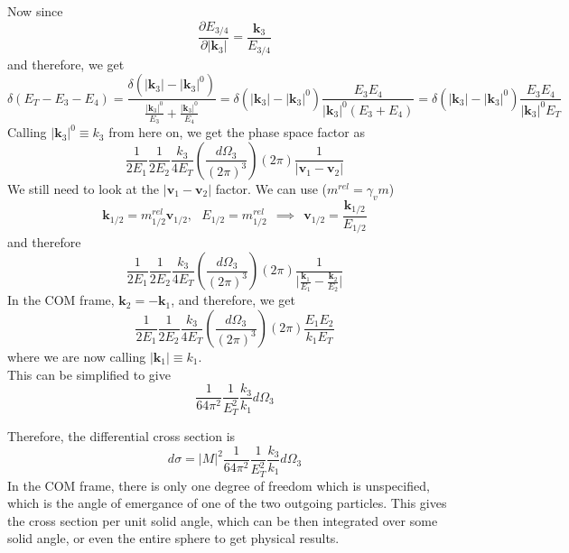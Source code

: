 \documentclass[11pt, notitlepage]{report}
\newcommand{\del}{\partial}
\numberwithin{equation}{section}
\begin{document}
Now since
\begin{equation*}
    \frac{\del E_{3/4}}{\del |\textbf{k}_3|} = \frac{\textbf{k}_3}{E_{3/4}}
\end{equation*}
and therefore, we get 
\begin{equation*}
    \delta(E_T - E_3 - E_4) = \frac{\delta\left(|\textbf{k}_3| - |\textbf{k}_3|^0\right)}{\displaystyle \frac{|\textbf{k}_3|^0}{E_3} + \frac{|\textbf{k}_3|^0}{E_4}} = \delta\left(|\textbf{k}_3| - |\textbf{k}_3|^0\right) \frac{E_3E_4}{|\textbf{k}_3|^0(E_3+E_4)} = \delta\left(|\textbf{k}_3| - |\textbf{k}_3|^0\right) \frac{E_3E_4}{|\textbf{k}_3|^0 E_T}
\end{equation*}
Calling \(|\textbf{k}_3|^0 \equiv k_3\) from here on, we get the phase space factor as
\begin{equation*}
    \frac{1}{2E_1}\frac{1}{2E_2}\frac{k_3}{4 E_T}\left(\frac{d\Omega_3}{(2\pi)^3}\right)(2\pi)\frac{1}{|\textbf{v}_1 - \textbf{v}_2|}
\end{equation*}
We still need to look at the \(|\textbf{v}_1 - \textbf{v}_2|\) factor. We can use (\(m^{rel} = \gamma_v m\))
\begin{equation*}
    \textbf{k}_{1/2} = m_{1/2}^{rel} \textbf{v}_{1/2},~~~E_{1/2} = m_{1/2}^{rel}~~\implies~~\textbf{v}_{1/2} = \frac{\textbf{k}_{1/2}}{E_{1/2}}
\end{equation*}
and therefore
\begin{equation*}
    \frac{1}{2E_1}\frac{1}{2E_2}\frac{k_3}{4 E_T}\left(\frac{d\Omega_3}{(2\pi)^3}\right)(2\pi)\frac{1}{\displaystyle\bigg|\frac{\textbf{k}_1}{E_1} - \frac{\textbf{k}_2}{E_2}\bigg|}
\end{equation*}
In the COM frame, \(\textbf{k}_2 = -\textbf{k}_1\), and therefore, we get 
\begin{equation*}
    \frac{1}{2E_1}\frac{1}{2E_2}\frac{k_3}{4 E_T}\left(\frac{d\Omega_3}{(2\pi)^3}\right)(2\pi)\frac{E_1E_2}{k_1E_T}
\end{equation*}
where we are now calling \(|\textbf{k}_1| \equiv k_1\).\\
This can be simplified to give 
\begin{equation*}
    \frac{1}{64 \pi^2} \frac{1}{E_T^2} \frac{k_3}{k_1} d\Omega_3
\end{equation*}

Therefore, the differential cross section is 
\begin{equation*}
    d\sigma = |M|^2 \frac{1}{64 \pi^2} \frac{1}{E_T^2} \frac{k_3}{k_1} d\Omega_3
\end{equation*}
In the COM frame, there is only one degree of freedom which is unspecified, which is the angle of emergance of one of the two outgoing particles. This gives the cross section per unit solid angle, which can be then integrated over some solid angle, or even the entire sphere to get physical results.\\
\end{document}
